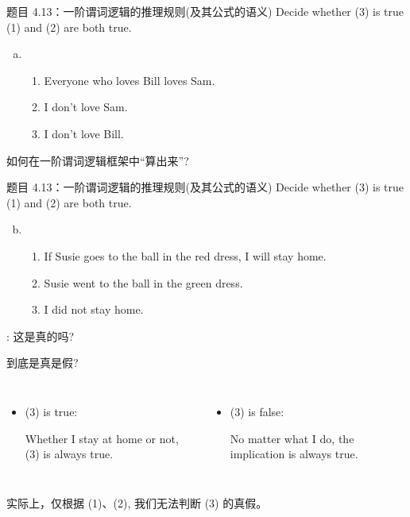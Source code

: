 \begin{frame}{}
  \begin{exampleblock}{题目 4.13：一阶谓词逻辑的推理规则(及其公式的语义)}
    Decide whether (3) is true  (1) and (2) are both true.

    \begin{enumerate}[(a)]
      \item 
	\begin{enumerate}[(1)]
	  \item Everyone who loves Bill loves Sam.
	  \item I don't love Sam.
	  \item I don't love Bill.
	\end{enumerate}
    \end{enumerate}
  \end{exampleblock}

  \vspace{0.50cm}
  \pause
  \centerline{ 如何在一阶谓词逻辑框架中``算出来''?}
\end{frame}

\begin{frame}{}
  \begin{exampleblock}{题目 4.13：一阶谓词逻辑的推理规则(及其公式的语义)}
    Decide whether (3) is true  (1) and (2) are both true.

    \begin{enumerate}[(a)]
      \setcounter{enumi}{1}
      \item 
	\begin{enumerate}[(1)]
	  \item If Susie goes to the ball in the red dress, I will stay home.
	  \item Susie went to the ball in the green dress.
	  \item I did not stay home.
	\end{enumerate}
    \end{enumerate}
  \end{exampleblock}

  \centerline{: 这是真的吗?}

  \pause
  \vspace{0.30cm}
  到底是真是假?
  \vspace{0.30cm}
  \begin{columns}
      \begin{itemize}
	\item (3) is true:

	Whether I stay at home or not, (3) is always true.
      \end{itemize}
      \begin{itemize}
        \item (3) is false:

	No matter what I do, the implication is always true.
      \end{itemize}
  \end{columns}

  \pause
  \vspace{0.50cm}
  \centerline{实际上，仅根据 (1)、(2), 我们无法判断 (3) 的真假。}
\end{frame}

